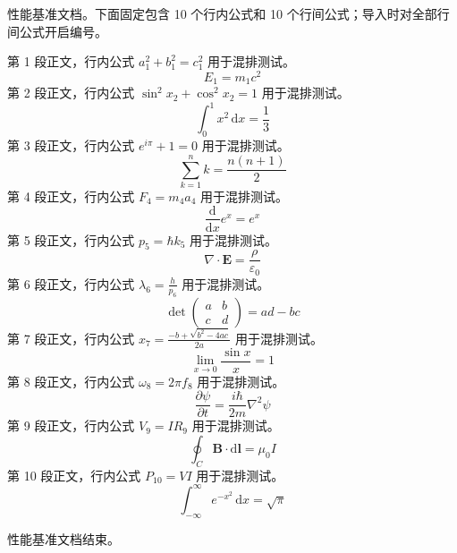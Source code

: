 性能基准文档。下面固定包含 10 个行内公式和 10 个行间公式；导入时对全部行间公式开启编号。

第 1 段正文，行内公式 $a_1^2+b_1^2=c_1^2$ 用于混排测试。
$$E_1=m_1c^2$$
第 2 段正文，行内公式 $\sin^2 x_2+\cos^2 x_2=1$ 用于混排测试。
$$\int_0^1 x^2\,\mathrm{d}x=\frac13$$
第 3 段正文，行内公式 $e^{i\pi}+1=0$ 用于混排测试。
$$\sum_{k=1}^{n} k=\frac{n(n+1)}2$$
第 4 段正文，行内公式 $F_4=m_4a_4$ 用于混排测试。
$$\frac{\mathrm{d}}{\mathrm{d}x}e^x=e^x$$
第 5 段正文，行内公式 $p_5=\hbar k_5$ 用于混排测试。
$$\nabla\cdot\mathbf{E}=\frac{\rho}{\varepsilon_0}$$
第 6 段正文，行内公式 $\lambda_6=\frac{h}{p_6}$ 用于混排测试。
$$\det\begin{pmatrix}a&b\\c&d\end{pmatrix}=ad-bc$$
第 7 段正文，行内公式 $x_7=\frac{-b+\sqrt{b^2-4ac}}{2a}$ 用于混排测试。
$$\lim_{x\to0}\frac{\sin x}{x}=1$$
第 8 段正文，行内公式 $\omega_8=2\pi f_8$ 用于混排测试。
$$\frac{\partial \psi}{\partial t}=\frac{i\hbar}{2m}\nabla^2\psi$$
第 9 段正文，行内公式 $V_9=IR_9$ 用于混排测试。
$$\oint_C \mathbf{B}\cdot\mathrm{d}\mathbf{l}=\mu_0 I$$
第 10 段正文，行内公式 $P_{10}=VI$ 用于混排测试。
$$\int_{-\infty}^{\infty}e^{-x^2}\,\mathrm{d}x=\sqrt{\pi}$$

性能基准文档结束。